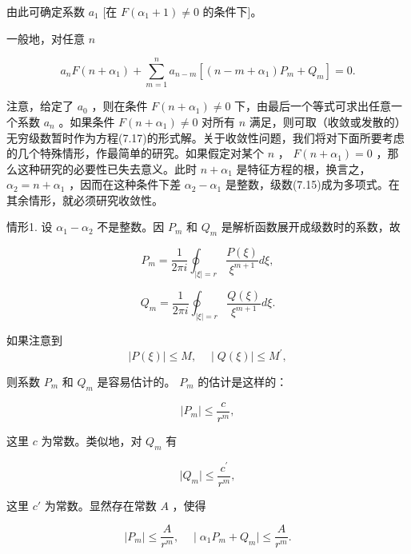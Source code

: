 由此可确定系数 $a_1$ [在 $F(\alpha_1 + 1) \neq 0$ 的条件下]。

一般地，对任意 $n$

\begin{equation*}
a _ {n} F (n + \alpha_ {1}) + \sum_ {m = 1} ^ {n} a _ {n - m} [ (n - m + \alpha_ {1}) P _ {m} + Q _ {m} ] = 0.
\end{equation*}

注意，给定了 $a_0$ ，则在条件 $F(n + \alpha_{1})\neq 0$ 下，由最后一个等式可求出任意一个系数 $a_{n}$ 。如果条件 $F(n + \alpha_{1}) \neq 0$ 对所有 $n$ 满足，则可取（收敛或发散的）无穷级数暂时作为方程(7.17)的形式解。关于收敛性问题，我们将对下面所要考虑的几个特殊情形，作最简单的研究。如果假定对某个 $n$ ， $F(n + \alpha_{1}) = 0$ ，那么这种研究的必要性已失去意义。此时 $n + \alpha_{1}$ 是特征方程的根，换言之， $\alpha_{2} = n + \alpha_{1}$ ，因而在这种条件下差 $\alpha_{2} - \alpha_{1}$ 是整数，级数(7.15)成为多项式。在其余情形，就必须研究收敛性。

情形1. 设 $\alpha_{1} - \alpha_{2}$ 不是整数。因 $P_{m}$ 和 $Q_{m}$ 是解析函数展开成级数时的系数，故

\begin{equation*}
P _ {m} = \frac {1}{2 \pi i} \oint_ {| \xi | = r} \frac {P (\xi)}{\xi^ {m + 1}} d \xi ,
\end{equation*}

\begin{equation*}
Q _ {m} = \frac {1}{2 \pi i} \oint_ {| \xi | = r} \frac {Q (\xi)}{\xi^ {m + 1}} d \xi .
\end{equation*}

如果注意到
\begin{equation*}
\mid P (\xi) \mid \leqslant M, \quad \mid Q (\xi) \mid \leqslant M ^ {\prime},
\end{equation*}

则系数 $P_{m}$ 和 $Q_{m}$ 是容易估计的。 $P_{m}$ 的估计是这样的：

\begin{equation*}
\mid P _ {m} \mid \leqslant \frac {c}{r ^ {m}},
\end{equation*}

这里 $c$ 为常数。类似地，对 $Q_{m}$ 有

\begin{equation*}
\mid Q _ {m} \mid \leqslant \frac {c ^ {\prime}}{r ^ {m}},
\end{equation*}

这里 $c'$ 为常数。显然存在常数 $A$ ，使得

\begin{equation*}
\mid P _ {m} \mid \leqslant \frac {A}{r ^ {m}}, \quad \mid \alpha_ {1} P _ {m} + Q _ {m} \mid \leqslant \frac {A}{r ^ {m}}.\tag{7.18}
\end{equation*}

